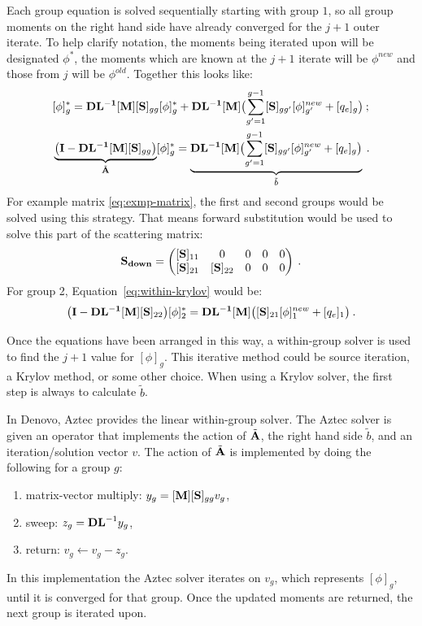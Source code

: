 Each group equation is solved sequentially starting with group $1$, so all group moments on the right hand side have already converged for the $j+1$ outer iterate. To help clarify notation, the moments being iterated upon will be designated $\phi^{*}$, the moments which are known at the $j+1$ iterate will be $\phi^{new}$ and those from $j$ will be $\phi^{old}$. Together this looks like:
\begin{align}
  &[\phi]_{g}^{*} =  \mathbf{DL^{-1}}[\mathbf{M}][\mathbf{S}]_{gg}[\phi]_{g}^{*} +  \mathbf{DL^{-1}}[\mathbf{M}] \bigl(  \sum_{g'=1}^{g-1} [\mathbf{S}]_{gg'}[\phi]_{g'}^{new} + [q_{e}]_{g} \bigr) \label{eq:within-unarranged} \:;  \\
  &\underbrace{\bigl( \mathbf{I} - \mathbf{DL^{-1}}[\mathbf{M}][\mathbf{S}]_{gg} \bigr)}_{\tilde{\mathbf{A}}}[\phi]_{g}^{*} = \underbrace{\mathbf{DL^{-1}}  [\mathbf{M}] \bigl(  \sum_{g'=1}^{g-1} [\mathbf{S}]_{gg'}[\phi]_{g'}^{new} + [q_{e}]_{g} \bigr) }_{\tilde{b}} \label{eq:within-krylov} \:. 
\end{align}
%
For example matrix \eqref{eq:exmp-matrix}, the first and second groups would be solved using this strategy. That means forward substitution would be used to solve this part of the scattering matrix:
%
\begin{equation}
  \mathbf{S_{down}} = \begin{pmatrix}
      [\ve{S}]_{11} &0 & 0 & 0 & 0 \\
      [\ve{S}]_{21} & [\ve{S}]_{22} & 0 & 0 & 0 \\  
      \end{pmatrix} \:.
          \label{eq:down-matrix}
\end{equation}
%
For group 2, Equation~\eqref{eq:within-krylov} would be:
%
\begin{equation}
  \bigl( \mathbf{I} - \mathbf{DL^{-1}}[\mathbf{M}][\mathbf{S}]_{22} \bigr)[\phi]_{2}^{*} = \mathbf{DL^{-1}}[\mathbf{M}] \bigl( [\mathbf{S}]_{21}[\phi]_{1}^{new}  + [q_{e}]_{1} \bigr) \:.
\end{equation}

Once the equations have been arranged in this way, a within-group solver is used to find the $j+1$ value for $[\phi]_{g}$. This iterative method could be source iteration, a Krylov method, or some other choice. When using a Krylov solver, the first step is always to calculate $\tilde{b}$. 

In Denovo, Aztec \cite{Heroux2007} provides the linear within-group solver. The Aztec solver is given an operator that implements the action of $\tilde{\mathbf{A}}$, the right hand side $\tilde{b}$, and an iteration/solution vector $v$. The action of $\tilde{\mathbf{A}}$ is implemented by doing the following for a group $g$:
\begin{enumerate}
  \item matrix-vector multiply: $y_{g} = [\mathbf{M}][\mathbf{S}]_{gg} v_{g}$,
  \item sweep: $z_{g} = \mathbf{DL}^{-1} y_{g}$,
  \item return: $v_{g} \leftarrow v_{g} - z_{g}$.
\end{enumerate}
In this implementation the Aztec solver iterates on $v_{g}$, which represents $[\phi]_{g}$, until it is converged for that group. Once the updated moments are returned, the next group is iterated upon. 

